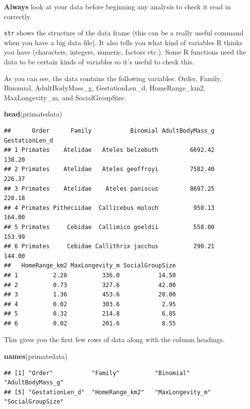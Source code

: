 \documentclass[]{book}
\newenvironment{Shaded}{\begin{snugshade}}{\end{snugshade}}
\newcommand{\KeywordTok}[1]{\textcolor[rgb]{0.13,0.29,0.53}{\textbf{{#1}}}}
\newcommand{\NormalTok}[1]{{#1}}
\begin{document}
\textbf{Always} look at your data before beginning any analysis to check
it read in correctly.

\texttt{str} shows the structure of the data frame (this can be a really
useful command when you have a big data file). It also tells you what
kind of variables R thinks you have (characters, integers, numeric,
factors etc.). Some R functions need the data to be certain kinds of
variables so it's useful to check this.

As you can see, the data contains the following variables: Order,
Family, Binomial, AdultBodyMass\_g, GestationLen\_d, HomeRange\_km2,
MaxLongevity\_m, and SocialGroupSize.

\begin{Shaded}
\begin{Highlighting}[]
\KeywordTok{head}\NormalTok{(primatedata)}
\end{Highlighting}
\end{Shaded}

\begin{verbatim}
##      Order      Family           Binomial AdultBodyMass_g GestationLen_d
## 1 Primates    Atelidae   Ateles belzebuth         6692.42         138.20
## 2 Primates    Atelidae   Ateles geoffroyi         7582.40         226.37
## 3 Primates    Atelidae    Ateles paniscus         8697.25         228.18
## 4 Primates Pitheciidae  Callicebus moloch          958.13         164.00
## 5 Primates     Cebidae  Callimico goeldii          558.00         153.99
## 6 Primates     Cebidae Callithrix jacchus          290.21         144.00
##   HomeRange_km2 MaxLongevity_m SocialGroupSize
## 1          2.28          336.0           14.50
## 2          0.73          327.6           42.00
## 3          1.36          453.6           20.00
## 4          0.02          303.6            2.95
## 5          0.32          214.8            6.85
## 6          0.02          201.6            8.55
\end{verbatim}

This gives you the first few rows of data along with the column
headings.

\begin{Shaded}
\begin{Highlighting}[]
\KeywordTok{names}\NormalTok{(primatedata)}
\end{Highlighting}
\end{Shaded}

\begin{verbatim}
## [1] "Order"           "Family"          "Binomial"        "AdultBodyMass_g"
## [5] "GestationLen_d"  "HomeRange_km2"   "MaxLongevity_m"  "SocialGroupSize"
\end{verbatim}
\end{document}
